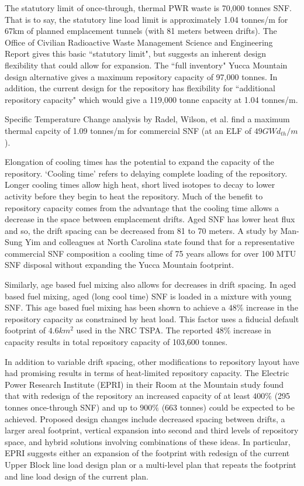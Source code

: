 The statutory limit of once-through, thermal PWR waste is 70,000 tonnes SNF. That is to say, the 
statutory line load limit is approximately 1.04 tonnes/m for 67km of planned emplacement tunnels 
(with 81 meters between drifts). The Office of Civilian Radioactive Waste Management Science and 
Engineering Report gives this basic ``statutory limit", but suggests an inherent design flexibility 
that could allow for expansion. The ``full inventory" Yucca Mountain design alternative gives a 
maximum repository capacity of 97,000 tonnes. In addition, the current design for the repository has 
flexibility for ``additional repository capacity" which would give a 119,000 tonne capacity at 1.04 
tonnes/m.\cite{OCRWMSciEng} 

Specific Temperature Change analysis by Radel, Wilson, et al. find a maximum thermal capcity of 1.09 
tonnes/m for commercial SNF (at an ELF of $49 GWd_{th}/m$).\cite{radel_effect_2007} 

Elongation of cooling times has the potential to expand the capacity of the repository. `Cooling 
time' refers to delaying complete loading of the repository. Longer cooling times allow high heat, 
short lived isotopes to decay to lower activity before they begin to heat the repository. Much of 
the benefit to repository capacity comes from the advantage that the cooling time allows a decrease 
in the space between emplacement drifts. Aged SNF has lower heat flux and so, the drift spacing can 
be decreased from 81 to 70 meters. A study by Man-Sung Yim and colleagues at North Carolina state 
found that for a representative commercial SNF composition a cooling time of 75 years allows for 
over 100 MTU SNF disposal without expanding the Yucca Mountain footprint.\cite{li_examining_2007}

Similarly, age based fuel mixing also allows for decreases in drift spacing. In aged based fuel 
mixing, aged (long cool time) SNF is loaded in a mixture with young SNF. This age based fuel mixing 
has been shown to achieve a $48\%$ increase in the repository capacity as constrained by heat 
load.\cite{nicholson_thermal_2007} This factor uses a fiducial default footprint of $4.6 km^2$ used 
in the NRC TSPA. The reported $48\%$ increase in capacity results in total repository capacity of 
103,600 tonnes.\cite{williams_contract_2001}

In addition to variable drift spacing, other modifications to repository layout have had promising 
results in terms of heat-limited repository capacity. The Electric Power Research Institute (EPRI) 
in their Room at the Mountain study found that with redesign of the repository an increased capacity 
of at least $400\%$ (295 tonnes once-through SNF) and up to $900\%$ (663 tonnes) could be expected 
to be achieved. Proposed design changes include decreased spacing between drifts, a larger areal 
footprint, vertical expansion into second and third levels of repository space, and hybrid solutions 
involving combinations of these ideas. In particular, EPRI suggests either an expansion of the 
footprint with redesign of the current Upper Block line load design plan or a multi-level plan that 
repeats the footprint and line load design of the current plan.\cite{kessler_room_2006}

